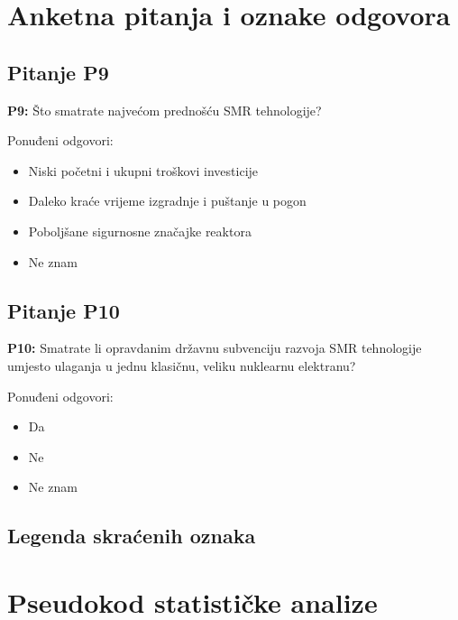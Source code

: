 \section{Anketna pitanja i oznake odgovora}

\subsection{Pitanje P9}

\textbf{P9:} Što smatrate najvećom prednošću SMR tehnologije?

Ponuđeni odgovori:

\begin{itemize}[nosep]
  \item Niski početni i ukupni troškovi investicije
  \item Daleko kraće vrijeme izgradnje i puštanje u pogon
  \item Poboljšane sigurnosne značajke reaktora
  \item Ne znam
\end{itemize}

\subsection{Pitanje P10}

\textbf{P10:} Smatrate li opravdanim državnu subvenciju razvoja SMR tehnologije umjesto ulaganja u jednu klasičnu, veliku nuklearnu elektranu?

Ponuđeni odgovori:

\begin{itemize}[nosep]
  \item Da
  \item Ne
  \item Ne znam
\end{itemize}

\subsection{Legenda skraćenih oznaka}

\begin{table}[H]
\centering
\caption{Legenda skraćenih oznaka korištenih u grafikonima}

\end{table}

\newpage

\section{Pseudokod statističke analize}

